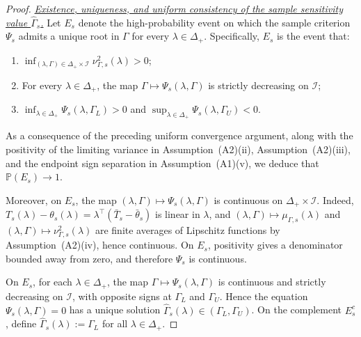 \documentclass[12pt,leqno,titlepage]{amsart}
\newcommand{\1}{\mathbbm{1}}
\begin{document}
\begin{bibunit}
{\begin{proof}
\noindent\textit{\underline{Existence, uniqueness, and uniform consistency of the sample sensitivity value $\widehat\Gamma_s$.}} Let $E_s$ denote the high-probability event on which the sample criterion $\Psi_s$ admits a unique root in $\Gamma$ for every $\lambda \in \Delta_+$. Specifically, $E_s$ is the event that:
\begin{enumerate}[label=(\alph*)]
\item \(\inf_{(\lambda,\Gamma)\in\Delta_+\times\mathcal I}\nu_{\Gamma,s}^2(\lambda)>0\);
\item For every \(\lambda\in\Delta_+\), the map
$
\Gamma\mapsto \Psi_s(\lambda,\Gamma)
$
is strictly decreasing on \(\mathcal I\);
\item
$
\inf_{\lambda\in\Delta_+}\Psi_s(\lambda,\Gamma_L)>0
$ and $
\sup_{\lambda\in\Delta_+}\Psi_s(\lambda,\Gamma_U)<0.
$
\end{enumerate}
As a consequence of the preceding uniform convergence argument, along with the positivity of the limiting variance in Assumption~\textup{(A2)(ii)}, Assumption~\textup{(A2)(iii)}, and the endpoint sign separation in Assumption~\textup{(A1)(v)}, we deduce that $\mathbb P(E_s)\to 1$.

Moreover, on \(E_s\), the map
\((\lambda,\Gamma)\mapsto\Psi_s(\lambda,\Gamma)\) is continuous on
\(\Delta_+\times\mathcal I\). Indeed,
$
T_s(\lambda)-\theta_s(\lambda)
=
\lambda^\top(\bar T_s-\bar\theta_s)
$
is linear in \(\lambda\), and
\((\lambda,\Gamma)\mapsto\mu_{\Gamma,s}(\lambda)\) and
\((\lambda,\Gamma)\mapsto\nu_{\Gamma,s}^2(\lambda)\) are finite averages of
Lipschitz functions by Assumption~\textup{(A2)(iv)}, hence continuous. On
\(E_s\), positivity gives a denominator bounded away from zero, and therefore
\(\Psi_s\) is continuous.

On \(E_s\), for each \(\lambda\in\Delta_+\), the map \(\Gamma\mapsto\Psi_s(\lambda,\Gamma)\) is continuous and strictly decreasing on \(\mathcal I\), with opposite signs at \(\Gamma_L\) and \(\Gamma_U\). Hence the equation
$
\Psi_s(\lambda,\Gamma)=0
$
has a unique solution \(\widehat\Gamma_s(\lambda)\in(\Gamma_L,\Gamma_U)\). On the complement \(E_s^c\), define \(\widehat\Gamma_s(\lambda):=\Gamma_L\) for all \(\lambda\in\Delta_+\).


\end{proof}}
\end{bibunit}
\end{document}
